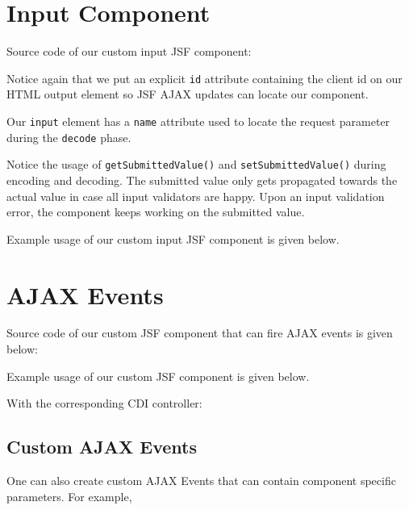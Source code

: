 \section{Input Component}

Source code of our custom input JSF component:

Notice again that we put an explicit \texttt{id} attribute containing the client id on our HTML output element so JSF AJAX updates can locate our component.

Our \texttt{input} element has a \texttt{name} attribute used to locate the request parameter during the \texttt{decode} phase.

Notice the usage of \texttt{getSubmittedValue()} and \texttt{setSubmittedValue()} during encoding and decoding.
The submitted value only gets propagated towards the actual value in case all input validators are happy.
Upon an input validation error, the component keeps working on the submitted value.

Example usage of our custom input JSF component is given below.


\section{AJAX Events}

Source code of our custom JSF component that can fire AJAX events is given below:


Example usage of our custom JSF component is given below.


With the corresponding CDI controller:


\subsection{Custom AJAX Events}

One can also create custom AJAX Events that can contain component specific parameters.
For example,


